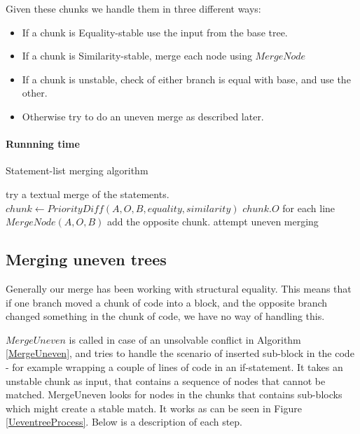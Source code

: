 \documentclass[11pt]{article}
\begin{document}
Given these chunks we handle them in three different ways: 

\begin{itemize}
	\item If a chunk is Equality-stable use the input from the base tree.
	\item If a chunk is Similarity-stable, merge each node using $MergeNode$
	\item If a chunk is unstable, check of either branch is equal with base, and use the other.
	\item Otherwise try to do an uneven merge as described later.
\end{itemize}

\paragraph{Runnning time} 

\begin{algorithm}
  \caption{Statement-list merging algorithm}
  \label{MergeStatementList}
\begin{algorithmic}
    \State try  a textual merge of the statements.
        \State $chunk \gets PriorityDiff(A, O, B, equality, similarity)$
                \State \Return $chunk.O$
                \State for each line \Return $MergeNode(A, O, B)$
                \State add the opposite chunk.
            \Else
                \State attempt uneven merging
            \EndIf
        \EndFor
    \EndIf
\EndFunction
\end{algorithmic}
\end{algorithm}

\subsection{Merging uneven trees}

\label{MergingUnevenSection}
Generally our merge has been working with structural equality. This means that if one branch moved a chunk of code into a block, and the opposite branch changed something in the chunk of code, we have no way of handling this.

$MergeUneven$ is called in case of an unsolvable conflict in Algorithm \ref{MergeUneven}, and tries to handle the scenario of inserted sub-block in the code - for example wrapping a couple of lines of code in an if-statement. It takes an unstable chunk as input, that contains a sequence of nodes that cannot be matched. MergeUneven looks for nodes in the chunks that contains sub-blocks which might create a stable match. It works as can be seen in Figure \ref{UeventreeProcess}. Below is a description of each step.
\end{document}
